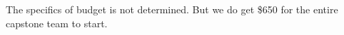 The specifics of budget is not determined. But we do get \$650 for the entire capstone team to start.